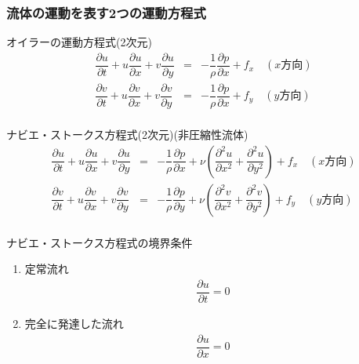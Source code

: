 \documentclass[a4paper]{jsarticle}
\begin{document}
\subsubsection{流体の運動を表す2つの運動方程式}
\begin{itembox}[l]{オイラーの運動方程式(2次元)}
    \begin{eqnarray*}
        \dfrac{\partial u}{\partial t}+u\dfrac{\partial u}{\partial x}+v\dfrac{\partial u}{\partial y}&=&-\dfrac{1}{\rho}\dfrac{\partial p}{\partial x}+f_x\quad(x方向)\\
        \dfrac{\partial v}{\partial t}+u\dfrac{\partial v}{\partial x}+v\dfrac{\partial v}{\partial y}&=&-\dfrac{1}{\rho}\dfrac{\partial p}{\partial x}+f_y\quad(y方向)\\
    \end{eqnarray*}
\end{itembox}
\begin{itembox}[l]{ナビエ・ストークス方程式(2次元)\quad(非圧縮性流体)}
    \begin{eqnarray*}
        \dfrac{\partial u}{\partial t}+u\dfrac{\partial u}{\partial x}+v\dfrac{\partial u}{\partial y}&=&-\dfrac{1}{\rho}\dfrac{\partial p}{\partial x}+\nu\left(\dfrac{\partial^2 u}{\partial x^2}+\dfrac{\partial^2 u}{\partial y^2}\right)+f_x\quad(x方向)\\
        \dfrac{\partial v}{\partial t}+u\dfrac{\partial v}{\partial x}+v\dfrac{\partial v}{\partial y}&=&-\dfrac{1}{\rho}\dfrac{\partial p}{\partial y}+\nu\left(\dfrac{\partial^2 v}{\partial x^2}+\dfrac{\partial^2 v}{\partial y^2}\right)+f_y\quad(y方向)\\
    \end{eqnarray*}
\end{itembox}
\begin{itembox}[l]{ナビエ・ストークス方程式の境界条件}
    \begin{enumerate}
        \item 定常流れ
              \begin{eqnarray*}
                  \dfrac{\partial u}{\partial t}=0
              \end{eqnarray*}
        \item 完全に発達した流れ
              \begin{eqnarray*}
                  \dfrac{\partial u}{\partial x}=0
              \end{eqnarray*}
    \end{enumerate}
\end{itembox}
\end{document}
